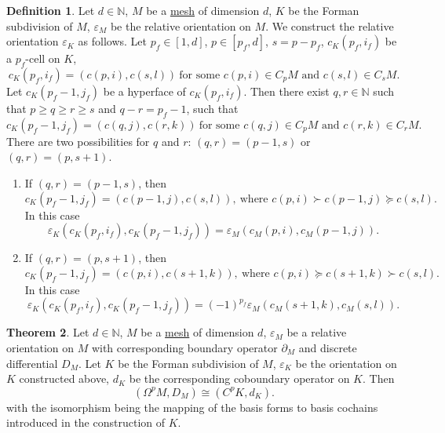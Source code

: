 \documentclass[fleqn]{article}
\theoremstyle{definition}
\newtheorem{theorem}{Theorem}[section]
\newtheorem{definition}[theorem]{Definition}
\newcommand{\N}{\mathbb{N}}
\begin{document}
\begin{definition}
  Let
    $d \in \N$,
    $M$ be a \hyperref[idec:mesh:definition]{mesh} of dimension $d$,
    $K$ be the Forman subdivision of $M$,
    $\varepsilon_M$ be the relative orientation on $M$.
  We construct the relative orientation $\varepsilon_K$ as follows.
  Let
    $p_f \in [1, d]$,
    $p \in [p_f, d]$,
    $s = p - p_f$,
    $c_K(p_f, i_f)$ be a $p_f$-cell on $K$,
  \begin{equation}
    c_K(p_f, i_f) = (c(p, i), c(s, l))\
    \text{for some $c(p, i) \in C_p M$ and $c(s, l) \in C_s M$}.
  \end{equation}
  Let $c_K(p_f - 1, j_f)$ be a hyperface of $c_K(p_f, i_f)$.
  Then there exist $q, r \in \N$ such that
  $p \geq q \geq r \geq s$ and $q - r = p_f - 1$,
  such that
  \begin{equation}
    c_K(p_f - 1, j_f) = (c(q, j), c(r, k))\
    \text{for some $c(q, j) \in C_p M$ and $c(r, k) \in C_r M$}.
  \end{equation}
  There are two possibilities for $q$ and $r$:
  $(q, r) = (p - 1, s)$ or $(q, r) = (p, s + 1)$.
  \begin{enumerate}
    \item
      If $(q, r) = (p - 1, s)$, then
      \begin{equation}
        c_K(p_f - 1, j_f) = (c(p - 1, j), c(s, l)),\
        \text{where $c(p, i) \succ c(p - 1, j) \succeq c(s, l)$}.
      \end{equation}
      In this case
      \begin{equation}
        \varepsilon_K(c_K(p_f, i_f), c_K(p_f - 1, j_f))
        = \varepsilon_M(c_M(p, i), c_M(p - 1, j)).
      \end{equation}
    \item
      If $(q, r) = (p, s + 1)$, then
      \begin{equation}
        c_K(p_f - 1, j_f) = (c(p, i), c(s + 1, k)),\
        \text{where $c(p, i) \succeq c(s + 1, k) \succ c(s, l)$}.
      \end{equation}
      In this case
      \begin{equation}
        \varepsilon_K(c_K(p_f, i_f), c_K(p_f - 1, j_f))
        = (-1)^{p_f} \varepsilon_M(c_M(s + 1, k), c_M(s, l)).
      \end{equation}
  \end{enumerate}
\end{definition}

\begin{theorem}
  Let
    $d \in \N$,
    $M$ be a \hyperref[idec:mesh:definition]{mesh} of dimension $d$,
    $\varepsilon_M$ be a relative orientation on $M$
      with corresponding boundary operator $\partial_M$
      and discrete differential $D_M$.
  Let $K$ be the Forman subdivision of $M$,
  $\varepsilon_K$ be the orientation on $K$ constructed above,
  $d_K$ be the corresponding coboundary operator on $K$.
  Then
  \begin{equation}
    (\Omega^p M, D_M) \cong (C^p K, d_K).
  \end{equation}
  with the isomorphism being the mapping of the basis forms to basis cochains
  introduced in the construction of $K$.
\end{theorem}
\end{document}
